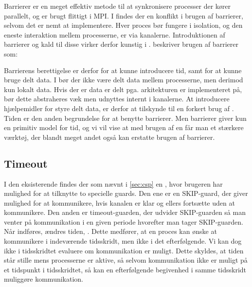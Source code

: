 Barrierer er en meget effektiv metode til at synkronisere processer der kører 
parallelt, og er brugt flittigt i MPI. I \csp findes der en konflikt i brugen 
af barrierer, selvom det er nemt at implementere. Hver proces bør fungere i isolation, og den eneste interaktion mellem processerne, er via kanalerne. 
Introduktionen af barrierer og kald til disse virker derfor kunstig i \csp. 
\citeauthor{crew} beskriver brugen af barrierer som:
\begin{otherlanguage}{english}
\end{otherlanguage}
Barrierens berettigelse er derfor for at kunne introducere tid, samt for at kunne bruge delt data. I \csp bør der ikke være delt data mellem processerne, men derimod kun  lokalt data. Hvis der er data er delt pga. arkitekturen \csp er implementeret på, bør dette abstraheres væk men udnyttes internt i kanalerne. At introducere hjælpemidler for styre delt data, er derfor at tilskynde til en forkert brug af \csp. Tiden er den anden begrundelse for at benytte barrierer.
Men barrierer giver kun en  primitiv model for tid, og vi vil vise at med brugen af en \des får man et stærkere værktøj, der blandt meget andet også kan erstatte brugen af barrierer.

\subsection{Timeout} 
I den eksisterende \pycsp findes der som nævnt i \autoref{sec:csp} en , hvor brugeren har mulighed for at tilknytte to specielle guards. Den ene er en SKIP-guard, der giver mulighed for at kommunikere, hvis kanalen er klar og ellers fortsætte uden at kommunikere. Den anden er timeout-guarden, der udvider SKIP-guarden så man venter på kommunikation i en given periode hvorefter man tager SKIP-guarden. 
Når \des indføres, ændres tiden, . Dette medfører, at en proces kan ønske at kommunikere i indeværende tidsskridt, men ikke i det efterfølgende.
Vi kan dog ikke i tidsskridtet evaluere om kommunikation er muligt. Dette skyldes, at tiden står stille mens processerne er aktive, så selvom kommunikation ikke er muligt på et tidspunkt i tidsskridtet, så kan en efterfølgende begivenhed i samme tidsskridt muliggøre kommunikation.

